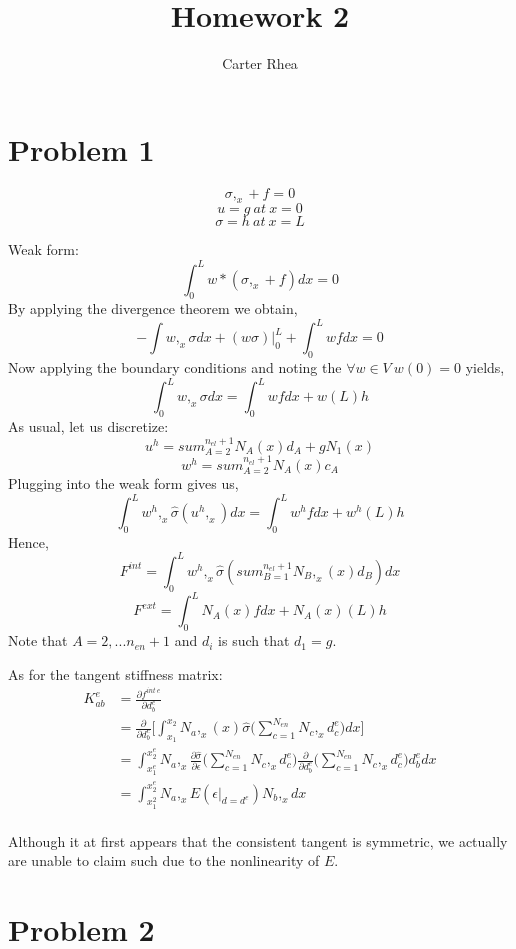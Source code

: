 \documentclass[12pt,a4paper]{article}
\author{Carter Rhea}
\title{Homework 2}
\begin{document}
	\maketitle
\section{Problem 1}
	$$\sigma,_x + f =0 $$
	$$u = g \ at \ x=0 $$
	$$\sigma = h \ at \ x = L$$

	Weak form:
	$$\int_0^L w*(\sigma,_x + f)dx = 0 $$
	By applying the divergence theorem we obtain,
	$$-\int w,_x\sigma dx + (w\sigma)\biggl|_0^L + \int_0^L wfdx = 0$$
	Now applying the boundary conditions and noting the $\forall w \in V \ w(0)=0$ yields,
	$$\int_0^Lw,_x\sigma dx = \int_0^L wfdx + w(L)h $$
	As usual, let us discretize:
	$$u^h = sum_{A=2}^{n_{el}+1} N_A(x)d_A+gN_1(x) $$
	$$w^h = sum_{A=2}^{n_{el}+1} N_A(x)c_A $$
	Plugging into the weak form gives us,
	$$\int_0^Lw^h,_x\hat{\sigma}(u^h,_x)dx = \int_0^L w^hf dx + w^h(L)h $$
	Hence,
	$$F^{int} =  \int_0^Lw^h,_x\hat{\sigma}(sum_{B=1}^{n_{el}+1} N_B,_x(x)d_B)dx$$
	$$F^{ext} = \int_0^L N_A(x)f dx + N_A(x)(L)h  $$
	Note that $A=2,...n_{en}+1$ and $d_i$ is such that $d_1 = g$.
	
	As for the tangent stiffness matrix:
	\begin{align*}
	K^e_{ab} &= \frac{\partial f^{int \ e}}{\partial d_b^e} \\
	&= \frac{\partial}{\partial d_b^e} \Big[ \int_{x_1}^{x_2} N_a,_x(x) \hat{\sigma} \big(\sum_{c=1}^{N_{en}}N_c,_xd_c^e\big)dx \Big] \\
	&= \int_{x_1^e}^{x_2^e}N_a,_x\frac{\partial \hat{\sigma}}{\partial \epsilon}\big(\sum_{c=1}^{N_{en}}N_c,_xd_c^e\big) \frac{\partial }{\partial d_b^e}\big(\sum_{c=1}^{N_{en}}N_c,_xd_c^e\big) d_b^e dx\\
	&= \int_{x_1^2}^{x_2^e}N_a,_xE(\epsilon\biggl|_{d=d^{e }} )N_b,_x dx\\		
	\end{align*}
	
	Although it at first appears that the consistent tangent is symmetric, we actually are unable to claim such due to the nonlinearity of $E$.
	
	\section{Problem 2}
	
\end{document}
